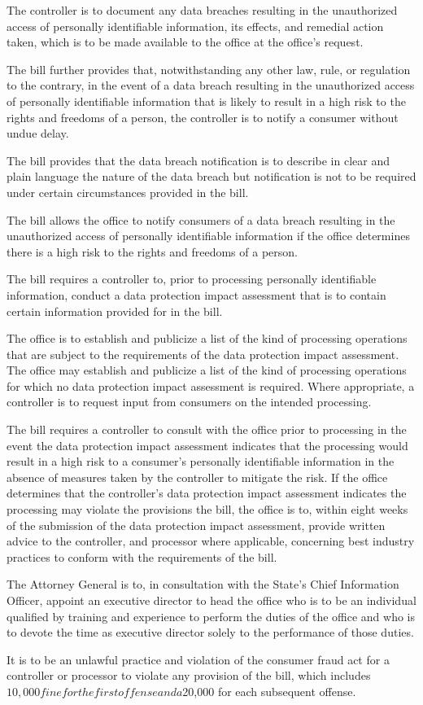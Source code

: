      The controller is to document any data breaches resulting in the unauthorized access of personally identifiable information, its effects, and remedial action taken, which is to be made available to the office at the office's request.

     The bill further provides that, notwithstanding any other law, rule, or regulation to the contrary, in the event of a data breach resulting in the unauthorized access of personally identifiable information that is likely to result in a high risk to the rights and freedoms of a person, the controller is to notify a consumer without undue delay.

     The bill provides that the data breach notification is to describe in clear and plain language the nature of the data breach but notification is not to be required under certain circumstances provided in the bill.

     The bill allows the office to notify consumers of a data breach resulting in the unauthorized access of personally identifiable information if the office determines there is a high risk to the rights and freedoms of a person.

     The bill requires a controller to, prior to processing personally identifiable information, conduct a data protection impact assessment that is to contain certain information provided for in the bill.

     The office is to establish and publicize a list of the kind of processing operations that are subject to the requirements of the data protection impact assessment. The office may establish and publicize a list of the kind of processing operations for which no data protection impact assessment is required. Where appropriate, a controller is to request input from consumers on the intended processing.

     The bill requires a controller to consult with the office prior to processing in the event the data protection impact assessment indicates that the processing would result in a high risk to a consumer's personally identifiable information in the absence of measures taken by the controller to mitigate the risk. If the office determines that the controller's data protection impact assessment indicates the processing may violate the provisions the bill, the office is to, within eight weeks of the submission of the data protection impact assessment, provide written advice to the controller, and processor where applicable, concerning best industry practices to conform with the requirements of the bill.

     The Attorney General is to, in consultation with the State's Chief Information Officer, appoint an executive director to head the office who is to be an individual qualified by training and experience to perform the duties of the office and who is to devote the time as executive director solely to the performance of those duties.

     It is to be an unlawful practice and violation of the consumer fraud act for a controller or processor to violate any provision of the bill, which includes $10,000 fine for the first offense and a $20,000 for each subsequent offense.